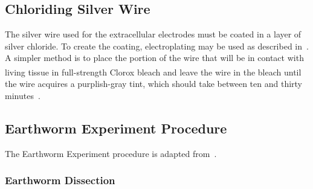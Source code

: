 \subsection{Chloriding Silver Wire}

The silver wire used for the extracellular electrodes must be coated in a layer of silver chloride.  To create the coating, electroplating may be used as described in~\cite{KuehJellies,WarnerChloriding}. A simpler method is to place the portion of the wire that will be in contact with living tissue in full-strength Clorox\textsuperscript{\textregistered} bleach and leave the wire in the bleach until the wire acquires a purplish-gray tint, which should take between ten and thirty minutes~\cite{WarnerChloriding}.
 
\subsection{Earthworm Experiment Procedure}

The Earthworm Experiment procedure is adapted from~\cite{Olivo,KuehJellies}.

\subsubsection{Earthworm Dissection}

